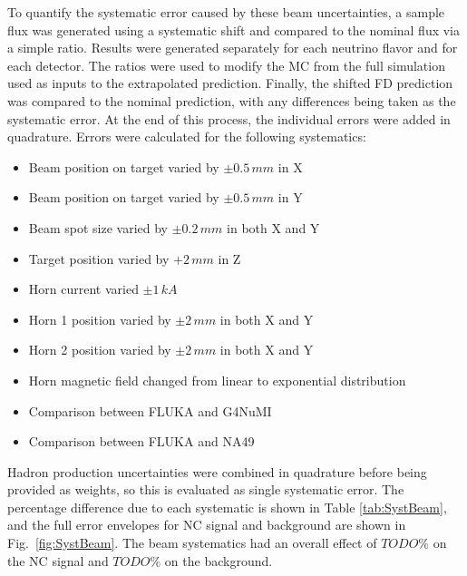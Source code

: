 To quantify the systematic error caused by these beam uncertainties, a sample flux was generated using a systematic shift and compared to the nominal flux via a simple ratio. Results were generated separately for each neutrino flavor and for each detector. The ratios were used to modify the MC from the full simulation used as inputs to the extrapolated prediction. Finally, the shifted FD prediction was compared to the nominal prediction, with any differences being taken as the systematic error. At the end of this process, the individual errors were added in quadrature. Errors were calculated for the following systematics:
\begin{itemize}
  \item Beam position on target varied by $\pm 0.5\,mm$ in X
  \item Beam position on target varied by $\pm 0.5\,mm$ in Y
  \item Beam spot size varied by $\pm 0.2\,mm$ in both X and Y
  \item Target position varied by $+ 2\, mm$ in Z
  \item Horn current varied $\pm 1\,kA$
  \item Horn 1 position varied by $\pm 2\,mm$ in both X and Y
  \item Horn 2 position varied by $\pm 2\,mm$ in both X and Y
  \item Horn magnetic field changed from linear to exponential distribution
  \item Comparison between FLUKA and G4NuMI
  \item Comparison between FLUKA and NA49
\end{itemize}
\n Hadron production uncertainties were combined in quadrature before being provided as weights, so this is evaluated as single systematic error. The percentage difference due to each systematic is shown in Table \ref{tab:SystBeam}, and the full error envelopes for NC signal and background are shown in Fig.~\ref{fig:SystBeam}. The beam systematics had an overall effect of $TODO\%$ on the NC signal and $TODO\%$ on the background.
